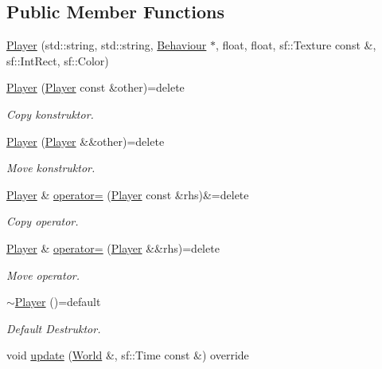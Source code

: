 \subsection*{Public Member Functions}
\begin{DoxyCompactItemize}
\item 
\hyperlink{classPlayer_a2a58e9556edd3dcbedd075055a715948}{Player} (std\+::string, std\+::string, \hyperlink{classBehaviour}{Behaviour} $\ast$, float, float, sf\+::\+Texture const \&, sf\+::\+Int\+Rect, sf\+::\+Color)
\item 
\hyperlink{classPlayer_adde042950f2b58b8f3a3268d1548abd4}{Player} (\hyperlink{classPlayer}{Player} const \&other)=delete
\begin{DoxyCompactList}\small\item\em Copy konstruktor. \end{DoxyCompactList}\item 
\hyperlink{classPlayer_a6beeb56865b114413e5d6a75a9c1e289}{Player} (\hyperlink{classPlayer}{Player} \&\&other)=delete
\begin{DoxyCompactList}\small\item\em Move konstruktor. \end{DoxyCompactList}\item 
\hyperlink{classPlayer}{Player} \& \hyperlink{classPlayer_a1e016eea05266424161f681fe5efca53}{operator=} (\hyperlink{classPlayer}{Player} const \&rhs)\&=delete
\begin{DoxyCompactList}\small\item\em Copy operator. \end{DoxyCompactList}\item 
\hyperlink{classPlayer}{Player} \& \hyperlink{classPlayer_a318b29ff03cd1f7e983a534c5f7f1c37}{operator=} (\hyperlink{classPlayer}{Player} \&\&rhs)=delete
\begin{DoxyCompactList}\small\item\em Move operator. \end{DoxyCompactList}\item 
\hyperlink{classPlayer_a40d3c47b65e9652c363a8fde41f7bbf5}{$\sim$\+Player} ()=default
\begin{DoxyCompactList}\small\item\em Default Destruktor. \end{DoxyCompactList}\item 
void \hyperlink{classPlayer_ad0f6610ee4a9f6d179bf404d1812be54}{update} (\hyperlink{classWorld}{World} \&, sf\+::\+Time const \&) override
\item 

\end{DoxyCompactItemize}
